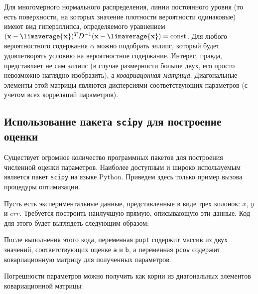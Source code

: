 Для многомерного нормального распределения, линии постоянного уровня (то
есть поверхности, на которых значение плотности вероятности одинаковые)
имеют вид гиперэллипса, определяемого уравнением
$(\mathbf{x} - \limaverage{\mathbf{x}})^T D^{-1} (\mathbf{x} - \limaverage{\mathbf{x}}) = \mathrm{const}$.
Для любого вероятностного содержания $\alpha$ можно подобрать эллипс, который будет
удовлетворять условию на вероятностное содержание. Интерес, правда,
представляет не сам эллипс (в случае размерности больше двух, его просто
невозможно наглядно изобразить), а \emph{ковариацонная матрица}. Диагональные элементы
этой матрицы являются дисперсиями соответствующих параметров (с учетом
всех корреляций параметров).

\subsection{Использование пакета \texttt{scipy} для построение оценки}

Существует огромное количество программных пакетов для построения численной оценки параметров. Наиболее доступным и широко используемым является пакет \texttt{scipy} на языке Python. Приведем здесь только пример вызова процедуры оптимизации.

Пусть есть экспериментальные данные, представленные в виде трех колонок: $x$, $y$ и $err$. Требуется построить наилучшую прямую, описывающую эти данные.
Код для этого будет выглядеть следующим образом:
%
%

После выполнения этого кода, переменная \texttt{popt} содержит массив из двух значений, соответствующих оценке \texttt{a} и \texttt{b}, а переменная \texttt{pcov} содержит ковариационную матрицу для полученных параметров. 

Погрешности параметров можно получить как корни из диагональных элементов ковариационной матрицы:
%    




